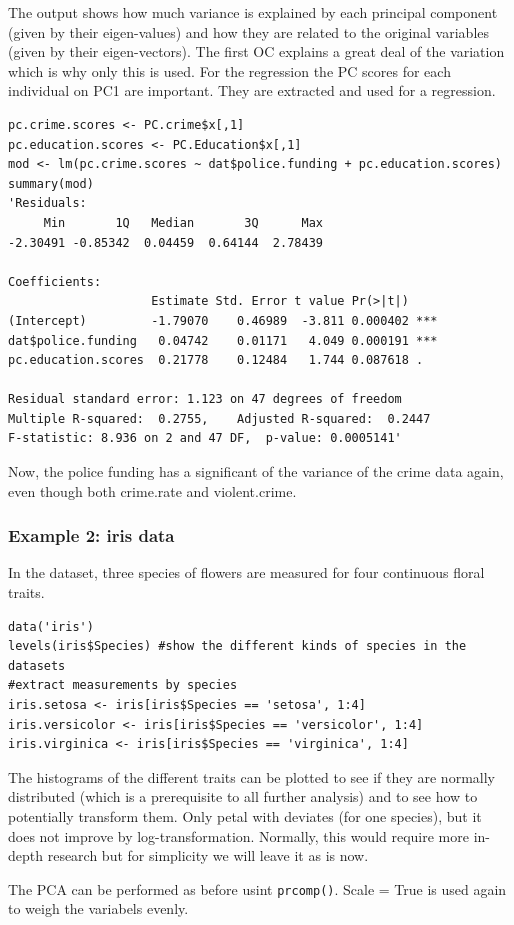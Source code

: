 \documentclass{article}
\begin{document}
The output shows how much variance is explained by each principal component (given by their eigen-values) and how they are related to the original variables (given by their eigen-vectors). The first OC explains a great deal of the variation which is why only this is used. For the regression the PC scores for each individual on PC1 are important. They are extracted and used for a regression.

\begin{lstlisting}
pc.crime.scores <- PC.crime$x[,1]
pc.education.scores <- PC.Education$x[,1]
mod <- lm(pc.crime.scores ~ dat$police.funding + pc.education.scores)
summary(mod)
'Residuals:
     Min       1Q   Median       3Q      Max 
-2.30491 -0.85342  0.04459  0.64144  2.78439 

Coefficients:
                    Estimate Std. Error t value Pr(>|t|)    
(Intercept)         -1.79070    0.46989  -3.811 0.000402 ***
dat$police.funding   0.04742    0.01171   4.049 0.000191 ***
pc.education.scores  0.21778    0.12484   1.744 0.087618 .  

Residual standard error: 1.123 on 47 degrees of freedom
Multiple R-squared:  0.2755,	Adjusted R-squared:  0.2447 
F-statistic: 8.936 on 2 and 47 DF,  p-value: 0.0005141'
\end{lstlisting}

Now, the police funding has a significant of the variance of the crime data again, even though both crime.rate and violent.crime.

\subsubsection{Example 2: iris data}
In the dataset, three species of flowers are measured for four continuous floral traits.

\begin{lstlisting}
data('iris')
levels(iris$Species) #show the different kinds of species in the datasets
#extract measurements by species
iris.setosa <- iris[iris$Species == 'setosa', 1:4]
iris.versicolor <- iris[iris$Species == 'versicolor', 1:4]
iris.virginica <- iris[iris$Species == 'virginica', 1:4]
\end{lstlisting}
The histograms of the different traits can be plotted to see if they are normally distributed (which is a prerequisite to all further analysis) and to see how to potentially transform them. Only petal with deviates (for one species), but it does not improve by log-transformation. Normally, this would require more in-depth research but for simplicity we will leave it as is now.\par 
The PCA can be performed as before usint \texttt{prcomp()}. Scale = True is used again to weigh the variabels evenly.
\end{document}

